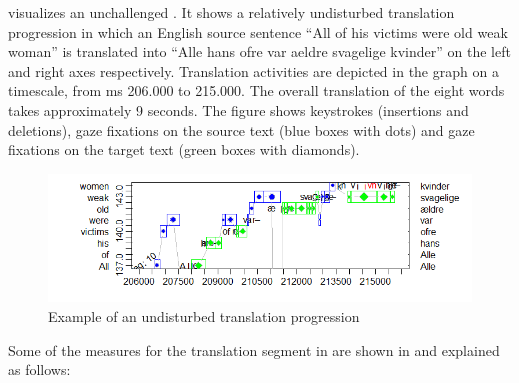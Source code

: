 \documentclass[output=paper]{LSP/langsci}
\begin{document}






 
 visualizes an unchallenged . It shows a relatively undisturbed translation progression in which an English source sentence ``All of his victims were old weak woman'' is translated into  ``Alle hans ofre var aeldre svagelige kvinder'' on the left and right axes respectively. Translation activities are depicted in the graph on a timescale, from ms 206.000 to 215.000. The overall translation of the eight words takes approximately 9 seconds. The figure shows keystrokes (insertions and deletions), gaze fixations on the source text (blue boxes with dots) and gaze fixations on the target text (green boxes with diamonds). 

\begin{figure}[h]
\includegraphics[width=\textwidth]{figures/carl-schaefer/sketch-img004.png}  
\caption{Example of an undisturbed translation progression}
\label{carl-schaeffer:fig:undist}
\end{figure}


  
Some of the measures for the translation segment in  are shown in  and explained as follows:
\end{document}
